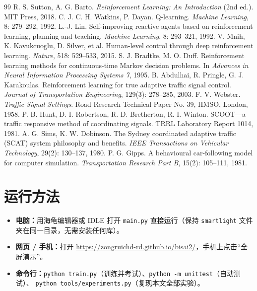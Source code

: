 \documentclass[UTF8,a4paper,zihao=-4,fontset=none]{ctexart}
\begin{document}
\begin{thebibliography}{99}\small
{} R. S. Sutton, A. G. Barto. \emph{Reinforcement Learning: An Introduction} (2nd ed.). MIT Press, 2018.
 C. J. C. H. Watkins, P. Dayan. Q-learning. \emph{Machine Learning}, 8: 279--292, 1992.
 L.-J. Lin. Self-improving reactive agents based on reinforcement learning, planning and teaching. \emph{Machine Learning}, 8: 293--321, 1992.
 V. Mnih, K. Kavukcuoglu, D. Silver, et al. Human-level control through deep reinforcement learning. \emph{Nature}, 518: 529--533, 2015.
 S. J. Bradtke, M. O. Duff. Reinforcement learning methods for continuous-time Markov decision problems. In \emph{Advances in Neural Information Processing Systems 7}, 1995.
 B. Abdulhai, R. Pringle, G. J. Karakoulas. Reinforcement learning for true adaptive traffic signal control. \emph{Journal of Transportation Engineering}, 129(3): 278--285, 2003.
 F. V. Webster. \emph{Traffic Signal Settings}. Road Research Technical Paper No. 39, HMSO, London, 1958.
 P. B. Hunt, D. I. Robertson, R. D. Bretherton, R. I. Winton. SCOOT---a traffic responsive method of coordinating signals. TRRL Laboratory Report 1014, 1981.
 A. G. Sims, K. W. Dobinson. The Sydney coordinated adaptive traffic (SCAT) system philosophy and benefits. \emph{IEEE Transactions on Vehicular Technology}, 29(2): 130--137, 1980.
 P. G. Gipps. A behavioural car-following model for computer simulation. \emph{Transportation Research Part B}, 15(2): 105--111, 1981.
\end{thebibliography}

\appendix
\section{运行方法}
\begin{itemize}
  \item \textbf{电脑：}用海龟编辑器或 IDLE 打开 \texttt{main.py} 直接运行（保持 \texttt{smartlight} 文件夹在同一目录，无需安装任何库）。
  \item \textbf{网页 / 手机：}打开 \url{https://zongruichd-rd.github.io/bisai2/}，手机上点击“全屏演示”。
  \item \textbf{命令行：}\texttt{python train.py}（训练并考试）、\texttt{python -m unittest}（自动测试）、
        \texttt{python tools/experiments.py}（复现本文全部实验）。
\end{itemize}
\end{document}
